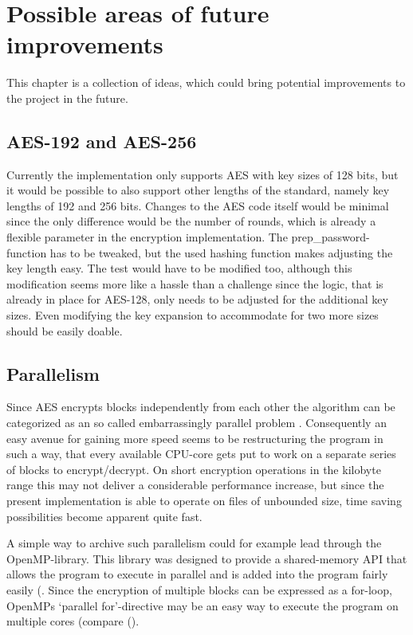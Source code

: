\hypertarget{possible-areas-of-future-improvements}{%
\section{Possible areas of future
improvements}\label{possible-areas-of-future-improvements}}

This chapter is a collection of ideas, which could bring potential
improvements to the project in the future.

\hypertarget{aes-192-and-aes-256}{%
\subsection{AES-192 and AES-256}\label{aes-192-and-aes-256}}

Currently the implementation only supports AES with key sizes of 128
bits, but it would be possible to also support other lengths of the
standard, namely key lengths of 192 and 256 bits. Changes to the AES
code itself would be minimal since the only difference would be the
number of rounds, which is already a flexible parameter in the
encryption implementation. The prep\_password-function has to be
tweaked, but the used hashing function makes adjusting the key length
easy. The test would have to be modified too, although this modification
seems more like a hassle than a challenge since the logic, that is
already in place for AES-128, only needs to be adjusted for the
additional key sizes. Even modifying the key expansion to accommodate
for two more sizes should be easily doable.

\hypertarget{parallelism}{%
\subsection{Parallelism}\label{parallelism}}

Since AES encrypts blocks independently from each other the algorithm
can be categorized as an so called embarrassingly parallel problem
\cite[p.48]{parallelprog}. Consequently an easy avenue for gaining more
speed seems to be restructuring the program in such a way, that every
available CPU-core gets put to work on a separate series of blocks to
encrypt/decrypt. On short encryption operations in the kilobyte range
this may not deliver a considerable performance increase, but since the
present implementation is able to operate on files of unbounded size,
time saving possibilities become apparent quite fast.

A simple way to archive such parallelism could for example lead through
the OpenMP-library. This library was designed to provide a shared-memory
API that allows the program to execute in parallel and is added into the
program fairly easily (\cite[ch. 5]{parallelprog}. Since the encryption of
multiple blocks can be expressed as a for-loop, OpenMPs `parallel
for'-directive may be an easy way to execute the program on multiple
cores (compare (\cite[ch. 5.5]{parallelprog}).


